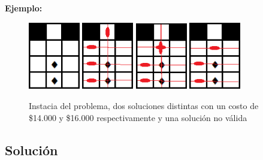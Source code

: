 \documentclass[a4paper, 10pt, twoside]{article}
\begin{document}
\textbf{Ejemplo:}
\begin{figure}[H]
  \centering
\includegraphics[width=0.20\textwidth]{ejemplo_problema3/grilla.png}
\includegraphics[width=0.20\textwidth]{ejemplo_problema3/grilla-sol16000.png}
\includegraphics[width=0.20\textwidth]{ejemplo_problema3/grilla-sol14000.png}
\includegraphics[width=0.20\textwidth]{ejemplo_problema3/grillaSinSol.png}
  \caption{Instacia del problema, dos soluciones distintas con un costo de \$14.000 y \$16.000 respectivamente y una solución no válida} 
  \label{fig:1}
\end{figure}


\subsection{Solución}

\newcommand{\Libre}{\texttt{Libre}}
\newcommand{\Sensado}{\texttt{Sensado}}
\newcommand{\Importante}{\texttt{Importante}}
\newcommand{\Pared}{\texttt{Pared}}
\newcommand{\SensorV}{\texttt{SensorVertical}}
\newcommand{\SensorH}{\texttt{SensorHorizontal}}
\newcommand{\SensorC}{\texttt{SensorCuadruple}}
\end{document}
